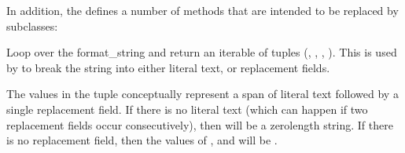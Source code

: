 \documentclass[letterpaper,10pt,english]{sphinxmanual}
\begin{document}
\begin{fulllineitems}
\begin{fulllineitems}
\end{fulllineitems}


In addition, the {\hyperref[\detokenize{string:string.Formatter}]{}} defines a number of methods that are
intended to be replaced by subclasses:

\begin{fulllineitems}
\label{\detokenize{string:string.Formatter.parse}}
Loop over the format\_string and return an iterable of tuples
(, , , ).  This is used
by {\hyperref[\detokenize{string:string.Formatter.vformat}]{}} to break the string into either literal text, or
replacement fields.

The values in the tuple conceptually represent a span of literal text
followed by a single replacement field.  If there is no literal text
(which can happen if two replacement fields occur consecutively), then
 will be a zero\sphinxhyphen{}length string.  If there is no replacement
field, then the values of ,  and 
will be .

\end{fulllineitems}



\end{fulllineitems}
\end{document}
